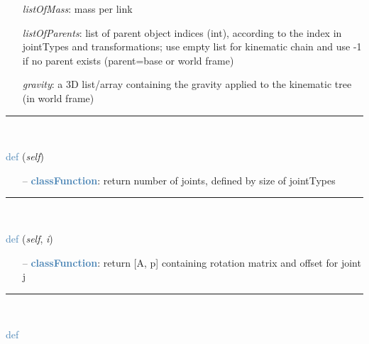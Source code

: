 \begin{itemize}[leftmargin=1.4cm]
\begin{itemize}[leftmargin=1.4cm]
\begin{itemize}[leftmargin=0.5cm]
\begin{itemize}[leftmargin=1.4cm]
\begin{itemize}[leftmargin=1.4cm]
\begin{itemize}[leftmargin=0.5cm]
\begin{itemize}[leftmargin=1.4cm]
\begin{itemize}[leftmargin=0.5cm]
\begin{itemize}[leftmargin=1.4cm]
\begin{itemize}[leftmargin=1.4cm]
\begin{itemize}[leftmargin=1.4cm]
\begin{itemize}[leftmargin=0.7cm]
\begin{itemize}[leftmargin=1.2cm]
    \item[] {\it   listOfMass}: mass per link
    \item[] {\it   listOfParents}: list of parent object indices (int), according to the index in jointTypes and transformations; use empty list for kinematic chain and use -1 if no parent exists (parent=base or world frame)
    \item[] {\it   gravity}: a 3D list/array containing the gravity applied to the kinematic tree (in world frame)
  \end{itemize}
\vspace{12pt}\end{itemize}
%
\noindent\rule{8cm}{0.75pt}\vspace{1pt} \\ 
\begin{flushleft}
\noindent \textcolor{steelblue}{def {\bf {}}}\label{sec:kinematicTree:KinematicTree33:Size}
({\it self})
\end{flushleft}
\setlength{\itemindent}{0.7cm}
\begin{itemize}[leftmargin=0.7cm]
  \item[--]  \textcolor{steelblue}{\bf classFunction}: return number of joints, defined by size of jointTypes\vspace{12pt}\end{itemize}
%
\noindent\rule{8cm}{0.75pt}\vspace{1pt} \\ 
\begin{flushleft}
\noindent \textcolor{steelblue}{def {\bf {}}}\label{sec:kinematicTree:KinematicTree33:XL}
({\it self}, {\it i})
\end{flushleft}
\setlength{\itemindent}{0.7cm}
\begin{itemize}[leftmargin=0.7cm]
  \item[--]  \textcolor{steelblue}{\bf classFunction}: return [A, p] containing rotation matrix and offset for joint j\vspace{12pt}\end{itemize}
%
\noindent\rule{8cm}{0.75pt}\vspace{1pt} \\ 
\begin{flushleft}
\noindent \textcolor{steelblue}{def {\bf {}}}\label{sec:kinematicTree:KinematicTree33:ForwardDynamicsCRB}

\end{flushleft}
\end{itemize}
\end{itemize}
\end{itemize}
\end{itemize}
\end{itemize}
\end{itemize}
\end{itemize}
\end{itemize}
\end{itemize}
\end{itemize}
\end{itemize}
